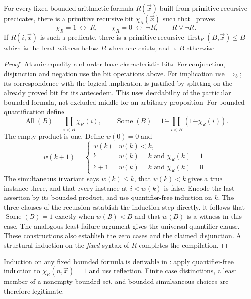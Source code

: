 \begin{lemma}\label{thm:bounded-reflection}
For every fixed bounded arithmetic formula $R(\vec x)$ built from primitive
recursive predicates, there is a primitive recursive bit $\chi_R(\vec x)$
such that \ipra\ proves
\[
 \chi_R=1\ \leftrightarrow\ R,\qquad
 \chi_R=0\ \leftrightarrow\ \neg R,\qquad R\vee\neg R.
\]
If $R(i,\vec x)$ is such a predicate, there is a primitive recursive
$\operatorname{first}_R(B,\vec x)\le B$ which is the least witness below $B$
when one exists, and is $B$ otherwise.
\end{lemma}
\begin{proof}
Atomic equality and order have characteristic bits. For conjunction,
disjunction and negation use the bit operations above. For implication use
$\Rightarrow_b$; its correspondence with the logical implication is justified
by splitting on the already proved bit for its antecedent. This uses
decidability of the particular bounded formula, not excluded middle for an
arbitrary proposition. For bounded quantification define
\[
 \operatorname{All}(B)=\prod_{i<B}\chi_R(i),\qquad
 \operatorname{Some}(B)=1\mathbin{\dot-}\prod_{i<B}(1\mathbin{\dot-}\chi_R(i)).
\]
The empty product is one. Define $w(0)=0$ and
\[
 w(k+1)=
 \begin{cases}
 w(k)&w(k)<k,\\
 k& w(k)=k\text{ and }\chi_R(k)=1,\\
 k+1& w(k)=k\text{ and }\chi_R(k)=0.
 \end{cases}
\]
The simultaneous invariant says $w(k)\le k$, that $w(k)<k$ gives a true
instance there, and that every instance at $i<w(k)$ is false. Encode the last
assertion by its bounded product, and use quantifier-free induction on $k$.
The three clauses of the recursion establish the induction step directly.
It follows that $\operatorname{Some}(B)=1$ exactly when $w(B)<B$ and that
$w(B)$ is a witness in this case. The analogous least-failure argument gives
the universal-quantifier clause. These constructions also establish the
zero cases and the claimed disjunction. A structural induction on the
\emph{fixed} syntax of $R$ completes the compilation.
\end{proof}

\begin{corollary}\label{thm:bounded-induction}
Induction on any fixed bounded formula is derivable in \ipra: apply
quantifier-free induction to $\chi_R(n,\vec x)=1$ and use reflection.
Finite case distinctions, a least member of a nonempty bounded set, and
bounded simultaneous choices are therefore legitimate.
\end{corollary}

